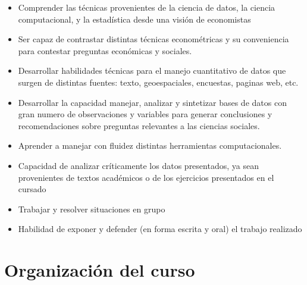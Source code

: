 \documentclass[11pt]{article}
\begin{document}
\begin{itemize}
\item Comprender las técnicas provenientes de la ciencia de datos, la ciencia computacional, y la estadística desde una visión de economistas 
\item Ser capaz de contrastar distintas técnicas econométricas y su conveniencia para contestar preguntas económicas y sociales.
\item Desarrollar habilidades técnicas para el manejo cuantitativo de datos que surgen de distintas fuentes: texto, geoespaciales, encuestas, paginas web, etc.
\item Desarrollar la capacidad manejar, analizar y sintetizar bases de datos con gran numero de observaciones y variables para generar conclusiones y recomendaciones sobre preguntas relevantes a las ciencias sociales.
\item Aprender a manejar con fluidez distintas herramientas computacionales.
\item Capacidad de analizar críticamente los datos presentados, ya sean provenientes de textos académicos o de los ejercicios presentados en el cursado
\item Trabajar y resolver situaciones en grupo 
\item Habilidad de exponer y defender (en forma escrita y oral) el trabajo realizado 



\end{itemize}

\section{Organización del curso}
\end{document}

